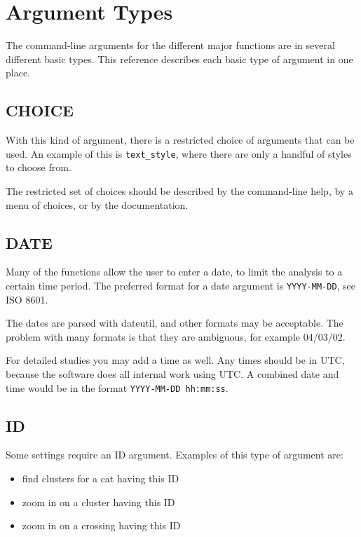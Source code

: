 \chapter{Argument Types}
\hypertarget{argument-types}{}

The command-line arguments for the different major functions are in
several different basic types. This reference describes each basic
type of argument in one place.

\section{CHOICE}
\hypertarget{argument-type-choice}{}

With this kind of argument, there is a restricted choice of arguments
that can be used. An example of this is \texttt{text\_style}, where there
are only a handful of styles to choose from.

The restricted set of choices should be described by the command-line
help, by a menu of choices, or by the documentation.

\section{DATE}
\hypertarget{argument-type-date}{}

Many of the functions allow the user to enter a date, to limit the
analysis to a certain time period. The preferred format for a date
argument is \texttt{YYYY-MM-DD}, see ISO 8601.

The dates are parsed with dateutil, and other formats may be
acceptable. The problem with many formats is that they are ambiguous,
for example 04/03/02.

For detailed studies you may add a time as well. Any times should be
in UTC, because the software does all internal work using UTC. A
combined date and time would be in the format
\texttt{YYYY-MM-DD hh:mm:ss}.

\section{ID}
\hypertarget{argument-type-id}{}

Some settings require an ID argument. Examples of this type of
argument are:

\begin{itemize}
\item find clusters for a cat having this ID
\item zoom in on a cluster having this ID
\item zoom in on a crossing having this ID
\end{itemize}

